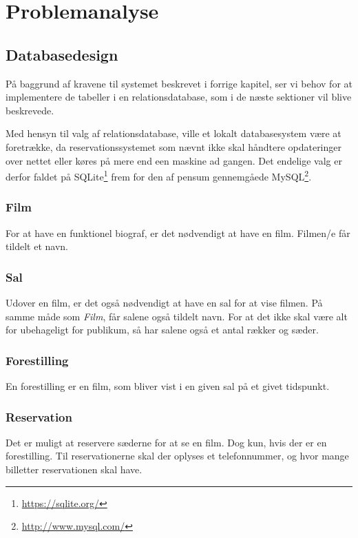\chapter{Problemanalyse}
\label{chapter:problemanalyse}

\section{Databasedesign}
\label{section:databasedesign}

På baggrund af kravene til systemet beskrevet i forrige kapitel, ser vi behov for at implementere de tabeller i en relationsdatabase, som i de næste sektioner vil blive beskrevede.

Med hensyn til valg af relationsdatabase, ville et lokalt databasesystem være at foretrække, da reservationssystemet som nævnt ikke skal håndtere opdateringer over nettet eller køres på mere end een maskine ad gangen. Det endelige valg er derfor faldet på SQLite\footnote{\url{https://sqlite.org/}} frem for den af pensum gennemgåede MySQL\footnote{\url{http://www.mysql.com/}}.

\subsection{Film}

For at have en funktionel biograf, er det nødvendigt at have en film. 
Filmen/e får tildelt et navn.

\subsection{Sal}

Udover en film, er det også nødvendigt at have en sal for at vise filmen. På samme måde som \textit{Film}, får salene også tildelt navn. For at det ikke skal være alt for ubehageligt for publikum, så har salene også et antal rækker og sæder. 

\subsection{Forestilling}

En forestilling er en film, som bliver vist i en given sal på et givet tidspunkt.

\subsection{Reservation}

Det er muligt at reservere sæderne for at se en film. Dog kun, hvis der er en forestilling. Til reservationerne skal der oplyses et telefonnummer, og hvor mange billetter reservationen skal have.

